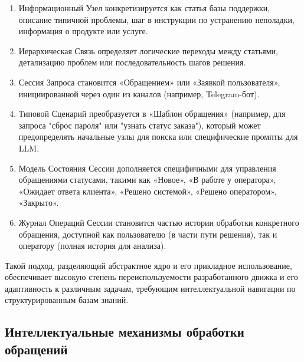 \begin{enumerate}[label=\arabic*.]
    \item Информационный Узел конкретизируется как статья базы поддержки, описание типичной проблемы, шаг в инструкции по устранению неполадки, информация о продукте или услуге.

    \item Иерархическая Связь определяет логические переходы между статьями, детализацию проблем или последовательность шагов решения.
    
    \item Сессия Запроса становится «Обращением» или «Заявкой пользователя», инициированной через один из каналов (например, Telegram-бот).

    \item Типовой Сценарий преобразуется в «Шаблон обращения» (например, для запроса "сброс пароля" или "узнать статус заказа"), который может предопределять начальные узлы для поиска или специфические промпты для LLM.

    \item Модель Состояния Сессии дополняется специфичными для управления обращениями статусами, такими как «Новое», «В работе у оператора», «Ожидает ответа клиента», «Решено системой», «Решено оператором», «Закрыто».

    \item Журнал Операций Сессии становится частью истории обработки конкретного обращения, доступной как пользователю (в части пути решения), так и оператору (полная история для анализа).
\end{enumerate}

Такой подход, разделяющий абстрактное ядро и его прикладное использование, обеспечивает высокую степень переиспользуемости разработанного движка и его адаптивность к различным задачам, требующим интеллектуальной навигации по структурированным базам знаний.

\subsection{Интеллектуальные механизмы обработки обращений}

